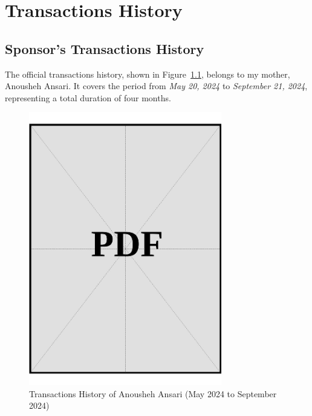 \chapter{Transactions History}\label{sec:transactions-history}

\section{Sponsor's Transactions History}
\label{sec:sponsor-transactions-history}

\noindent
The official transactions history, shown in Figure~\ref{fig:sponsor-transactions-history}, belongs to my mother, Anousheh Ansari. It covers the period from \textit{May 20, 2024} to \textit{September 21, 2024}, representing a total duration of four months.

\vspace*{\fill}
\begin{figure}[h]
    \centering
    \includegraphics[page=1, width=0.75\textwidth]{../application-docs/sponsor/funds/bank-account/transaction-history.pdf}
    \caption{Transactions History of Anousheh Ansari (May 2024 to September 2024)}
    \label{fig:sponsor-transactions-history}
\end{figure}
\vspace*{\fill}

